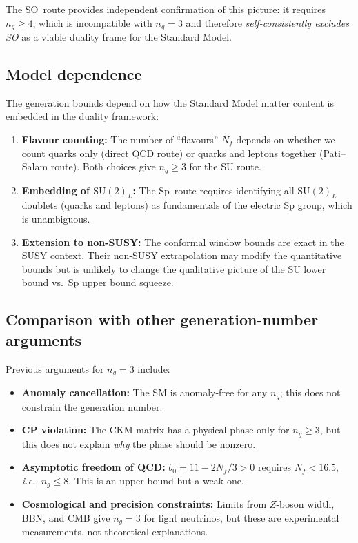\documentclass[11pt,a4paper]{article}
\theoremstyle{plain}
\theoremstyle{definition}
\theoremstyle{remark}
\newcommand{\Nf}{N_{\!f}}
\newcommand{\ngen}{n_g}
\newcommand{\SU}[1]{\mathrm{SU}(#1)}
\newcommand{\ie}{\textit{i.e.}}
\begin{document}
The SO~route provides independent confirmation of this picture: it
requires $\ngen \geq 4$, which is incompatible with $\ngen = 3$ and
therefore \emph{self-consistently excludes SO} as a viable duality frame
for the Standard Model.

\subsection{Model dependence}

The generation bounds depend on how the Standard Model matter content
is embedded in the duality framework:
\begin{enumerate}
  \item \textbf{Flavour counting:} The number of ``flavours'' $\Nf$
    depends on whether we count quarks only (direct QCD route) or
    quarks and leptons together (Pati--Salam route).  Both choices give
    $\ngen \geq 3$ for the SU route.
  \item \textbf{Embedding of $\SU{2}_L$:} The Sp~route requires
    identifying all $\SU{2}_L$ doublets (quarks and leptons) as
    fundamentals of the electric Sp group, which is unambiguous.
  \item \textbf{Extension to non-SUSY:} The conformal window bounds are
    exact in the SUSY context.  Their non-SUSY extrapolation may modify
    the quantitative bounds but is unlikely to change the qualitative
    picture of the SU lower bound vs.\ Sp upper bound squeeze.
\end{enumerate}

\subsection{Comparison with other generation-number arguments}

Previous arguments for $\ngen = 3$ include:
\begin{itemize}
  \item \textbf{Anomaly cancellation:} The SM is anomaly-free for any
    $\ngen$; this does not constrain the generation number.
  \item \textbf{CP violation:} The CKM matrix has a physical phase only
    for $\ngen \geq 3$, but this does not explain \emph{why} the phase
    should be nonzero.
  \item \textbf{Asymptotic freedom of QCD:} $b_0 = 11 - 2\Nf/3 > 0$
    requires $\Nf < 16.5$, \ie, $\ngen \leq 8$.  This is an upper bound
    but a weak one.
  \item \textbf{Cosmological and precision constraints:}
    Limits from $Z$-boson width, BBN, and CMB give $\ngen = 3$ for
    light neutrinos, but these are experimental measurements, not
    theoretical explanations.
\end{itemize}
\end{document}
